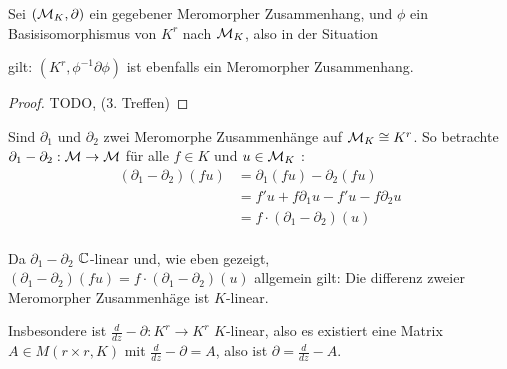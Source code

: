 \begin{lem}
  Sei $(\mathcal{M}_K,\partial)$ ein gegebener Meromorpher Zusammenhang, und $\phi$ ein
  Basisisomorphismus von $K^r$ nach $\mathcal{M}_K$, also in der Situation
  \begin{center}
  \end{center}
  gilt: $(K^r,\phi^{-1}\partial\phi)$ ist ebenfalls ein Meromorpher Zusammenhang.
\end{lem}
\begin{proof}
  TODO, (3. Treffen)
\end{proof}

Sind $\partial_1$ und $\partial_2$ zwei Meromorphe Zusammenhänge auf $\mathcal{M}_K\cong
K^r$. So betrachte $\partial_1-\partial_2:\mathcal{M}\rightarrow\mathcal{M}$ für alle $f\in K$ 
und $u\in \mathcal{M}_K$ :
\begin{align*}
  (\partial_1-\partial_2)(fu) &= \partial_1(fu)-\partial_2(fu)\\
  &= f'u+f\partial_1u-f'u-f\partial_2u\\
  &= f\cdot(\partial_1-\partial_2)(u)\\
\end{align*}
\begin{lem}
  Da $\partial_1-\partial_2$ $\mathbb{C}$-linear und, wie eben gezeigt,
  $(\partial_1-\partial_2)(fu)=f\cdot(\partial_1-\partial_2)(u)$ allgemein
  gilt: Die differenz zweier Meromorpher Zusammenhäge ist $K$-linear.
\end{lem}
Insbesondere ist $\frac{d}{dz}-\partial:K^r\rightarrow K^r$ $K$-linear, also es
existiert eine Matrix $A\in M(r\times r,K)$ mit $\frac{d}{dz}-\partial=A$, also
ist $\partial=\frac{d}{dz}-A$.


